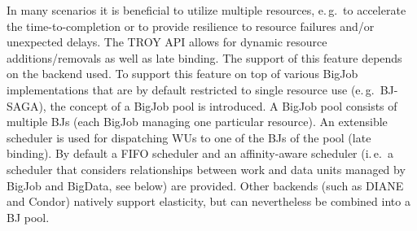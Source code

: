 \documentclass[conference,final]{IEEEtran}
\newcommand{\jhanote}[1]{ {\textcolor{red} { ***shantenu: #1 }}}
\newcommand{\alnote}[1]{ {\textcolor{blue} { ***andre: #1 }}}
\newcommand{\alnote}[1]{}
\newcommand{\jhanote}[1]{}
\begin{document}

In many scenarios it is beneficial to utilize multiple resources,
e.\,g.\ to accelerate the time-to-completion or to provide resilience
to resource failures and/or unexpected delays. The TROY API allows for
dynamic resource additions/removals as well as late binding. The
support of this feature depends on the backend used. To support this
feature on top of various BigJob implementations that are by default
restricted to single resource use (e.\,g.\ BJ-SAGA), the concept of a
BigJob pool is introduced. A BigJob pool consists of multiple BJs
(each BigJob managing one particular resource). An extensible
scheduler is used for dispatching WUs to one of the BJs of the pool
(late binding). By default a FIFO scheduler and an affinity-aware
scheduler (i.\,e.\ a scheduler that considers relationships between
work and data units managed by BigJob and BigData, see below) are
provided. Other backends (such as DIANE and Condor) natively support elasticity,
but can nevertheless be combined into a BJ pool.



\end{document}
